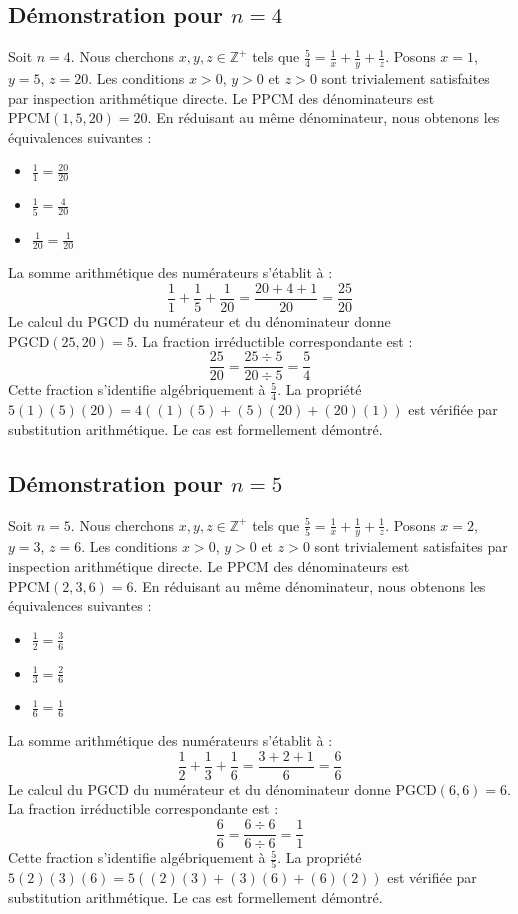 \documentclass[12pt,a4paper]{article}
\begin{document}
\subsection{Démonstration pour $n = 4$}
Soit $n = 4$. Nous cherchons $x, y, z \in \mathbb{Z}^{+}$ tels que $\frac{5}{4} = \frac{1}{x} + \frac{1}{y} + \frac{1}{z}$.
Posons $x = 1$, $y = 5$, $z = 20$.
Les conditions $x > 0$, $y > 0$ et $z > 0$ sont trivialement satisfaites par inspection arithmétique directe.
Le PPCM des dénominateurs est $\text{PPCM}(1, 5, 20) = 20$.
En réduisant au même dénominateur, nous obtenons les équivalences suivantes :
\begin{itemize}
    \item $\frac{1}{1} = \frac{20}{20}$
    \item $\frac{1}{5} = \frac{4}{20}$
    \item $\frac{1}{20} = \frac{1}{20}$
\end{itemize}
La somme arithmétique des numérateurs s'établit à :
$$ \frac{1}{1} + \frac{1}{5} + \frac{1}{20} = \frac{20 + 4 + 1}{20} = \frac{25}{20} $$
Le calcul du PGCD du numérateur et du dénominateur donne $\text{PGCD}(25, 20) = 5$.
La fraction irréductible correspondante est :
$$ \frac{25}{20} = \frac{25 \div 5}{20 \div 5} = \frac{5}{4} $$
Cette fraction s'identifie algébriquement à $\frac{5}{4}$.
La propriété $5(1)(5)(20) = 4((1)(5) + (5)(20) + (20)(1))$ est vérifiée par substitution arithmétique.
Le cas est formellement démontré.

\subsection{Démonstration pour $n = 5$}
Soit $n = 5$. Nous cherchons $x, y, z \in \mathbb{Z}^{+}$ tels que $\frac{5}{5} = \frac{1}{x} + \frac{1}{y} + \frac{1}{z}$.
Posons $x = 2$, $y = 3$, $z = 6$.
Les conditions $x > 0$, $y > 0$ et $z > 0$ sont trivialement satisfaites par inspection arithmétique directe.
Le PPCM des dénominateurs est $\text{PPCM}(2, 3, 6) = 6$.
En réduisant au même dénominateur, nous obtenons les équivalences suivantes :
\begin{itemize}
    \item $\frac{1}{2} = \frac{3}{6}$
    \item $\frac{1}{3} = \frac{2}{6}$
    \item $\frac{1}{6} = \frac{1}{6}$
\end{itemize}
La somme arithmétique des numérateurs s'établit à :
$$ \frac{1}{2} + \frac{1}{3} + \frac{1}{6} = \frac{3 + 2 + 1}{6} = \frac{6}{6} $$
Le calcul du PGCD du numérateur et du dénominateur donne $\text{PGCD}(6, 6) = 6$.
La fraction irréductible correspondante est :
$$ \frac{6}{6} = \frac{6 \div 6}{6 \div 6} = \frac{1}{1} $$
Cette fraction s'identifie algébriquement à $\frac{5}{5}$.
La propriété $5(2)(3)(6) = 5((2)(3) + (3)(6) + (6)(2))$ est vérifiée par substitution arithmétique.
Le cas est formellement démontré.
\end{document}
